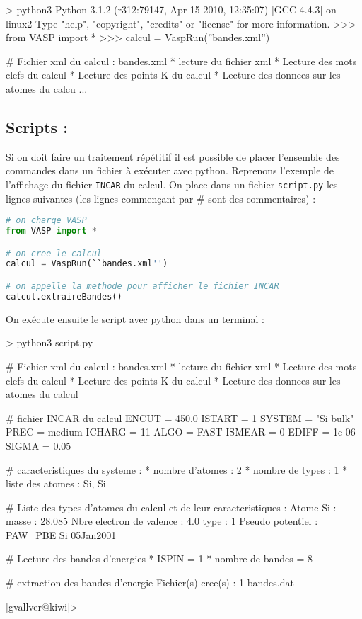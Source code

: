 \documentclass[10pt,a4paper,fleqn]{article}
\begin{document}
\begin{console}
> python3
Python 3.1.2 (r312:79147, Apr 15 2010, 12:35:07) 
[GCC 4.4.3] on linux2
Type "help", "copyright", "credits" or "license" for more information.
>>> from VASP import *
>>> calcul = VaspRun(''bandes.xml'')

# Fichier xml du calcul : bandes.xml
        * lecture du fichier xml
        * Lecture des mots clefs du calcul
        * Lecture des points K du calcul
        * Lecture des donnees sur les atomes du calcu
...
\end{console}

\subsection{Scripts :}

Si on doit faire un traitement répétitif il est possible de placer l'ensemble des commandes dans un
fichier à exécuter avec python. Reprenons l'exemple de l'affichage du fichier \verb!INCAR! du
calcul. On place dans un fichier \verb!script.py! les lignes suivantes (les lignes commençant par \#
sont des commentaires) :

\begin{lstlisting}[language=python,
	keywordstyle=\bfseries\color{FireBrick},
	basicstyle=\ttfamily,commentstyle=\color{Navy!60}]
# on charge VASP
from VASP import *

# on cree le calcul
calcul = VaspRun(``bandes.xml'')

# on appelle la methode pour afficher le fichier INCAR
calcul.extraireBandes()
\end{lstlisting}

On exécute ensuite le script avec python dans un terminal :

\begin{console}
> python3 script.py

# Fichier xml du calcul : bandes.xml
        * lecture du fichier xml
        * Lecture des mots clefs du calcul
        * Lecture des points K du calcul
        * Lecture des donnees sur les atomes du calcul

# fichier INCAR du calcul
     ENCUT = 450.0         ISTART = 1             SYSTEM =  "Si bulk"
      PREC = medium        ICHARG = 11              ALGO =  FAST     
    ISMEAR = 0              EDIFF = 1e-06          SIGMA = 0.05      

# caracteristiques du systeme :
        * nombre d'atomes  : 2
        * nombre de types  : 1
        * liste des atomes : Si, Si

# Liste des types d'atomes du calcul et de leur caracteristiques :
Atome Si : 
        masse                    : 28.085
        Nbre electron de valence : 4.0
        type                     : 1
        Pseudo potentiel         :  PAW_PBE Si 05Jan2001                   


# Lecture des bandes d'energies
        * ISPIN            = 1
        * nombre de bandes = 8

# extraction des bandes d'energie
Fichier(s) cree(s) : 1
        bandes.dat

[gvallver@kiwi]> 	   
\end{console}
\end{document}
